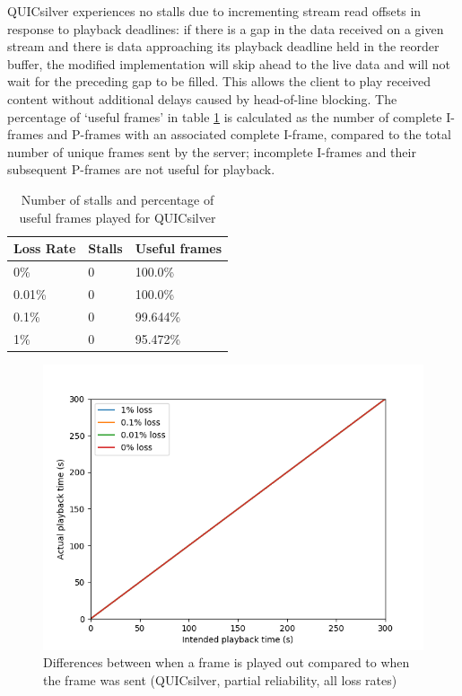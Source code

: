 \documentclass{mpaper}
\begin{document}
QUICsilver experiences no stalls due to incrementing stream read offsets in response to playback deadlines: if there is a gap in the data received on a given stream and there is data approaching its playback deadline held in the reorder buffer, the modified implementation will skip ahead to the live data and will not wait for the preceding gap to be filled. This allows the client to play received content without additional delays caused by head-of-line blocking. The percentage of `useful frames' in table \ref{par-playback-stats} is calculated as the number of complete I-frames and P-frames with an associated complete I-frame, compared to the total number of unique frames sent by the server; incomplete I-frames and their subsequent P-frames are not useful for playback.

\begin{table}[h!]
\centering
\label{stalls-data-par}
\begin{center}
\begin{tabular}{|p{2cm}|p{2cm}|p{2cm}|}
\hline
Loss Rate & Stalls & Useful frames\\ \hline
0\% & 0 & 100.0\% \\ \hline
0.01\%  & 0 & 100.0\% \\ \hline
0.1\%  & 0 & 99.644\% \\ \hline
1\%  & 0 & 95.472\% \\ \hline

\end{tabular}
\caption{Number of stalls and percentage of useful frames played for QUICsilver}
\label{par-playback-stats}
\end{center}
\end{table}

\begin{figure}[h]
\includegraphics[scale=0.5]{images/graphics-partial/50ms-relative-offsets-combined-PARTIAL.png}
\centering
\caption{Differences between when a frame is played out compared to when the frame was sent (QUICsilver, partial reliability, all loss rates)}
\label{playback-par}
\end{figure}
\end{document}
